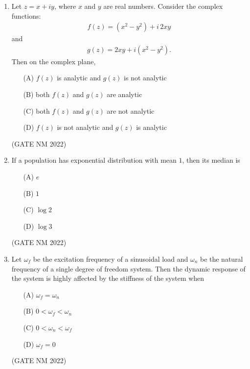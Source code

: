 \documentclass[journal,12pt,onecolumn]{IEEEtran}
\theoremstyle{remark}
\begin{document}
\begin{enumerate}
\item  Let $z = x + i y$, where $x$ and $y$ are real numbers. Consider the complex functions:
\begin{align*}
f(z) = (x^2 - y^2) + i\,  2xy
\end{align*}
and
\begin{align*}
g(z) = 2xy + i (x^2 - y^2).
\end{align*}
Then on the complex plane,
\begin{enumerate}
    \item[(A)] $f(z)$ is analytic and $g(z)$ is not analytic
    \item[(B)] both $f(z)$ and $g(z)$ are analytic
    \item[(C)] both $f(z)$ and $g(z)$ are not analytic
    \item[(D)] $f(z)$ is not analytic and $g(z)$ is analytic
\end{enumerate}

\hfill(GATE NM 2022)






\item  If a population has exponential distribution with mean $1$, then its median is

\begin{enumerate}
    \item[(A)] $e$
    \item[(B)] $1$
    \item[(C)] $\log 2$
    \item[(D)] $\log 3$
\end{enumerate}

\hfill(GATE NM 2022)




\item  Let $\omega_f$ be the excitation frequency of a sinusoidal load and $\omega_n$ be the natural frequency of a single degree of freedom system. Then the dynamic response of the system is highly affected by the stiffness of the system when

\begin{enumerate}
    \item[(A)] $\omega_f = \omega_n$
    \item[(B)] $0 < \omega_f < \omega_n$
    \item[(C)] $0 < \omega_n < \omega_f$
    \item[(D)] $\omega_f = 0$
\end{enumerate}

\hfill(GATE NM 2022)









\end{enumerate}
\end{document}
